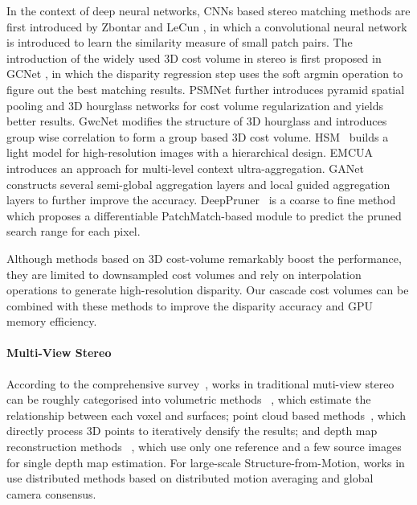 \documentclass[10pt,twocolumn,letterpaper]{article}
\begin{document}
In the context of deep neural networks, CNNs based stereo matching methods are first introduced by Zbontar and LeCun \cite{zbontar2015computing}, in which a convolutional neural network is introduced to learn the similarity measure of small patch pairs. The introduction of the widely used 3D cost volume in stereo is first proposed in GCNet \cite{kendall2017end},
in which the disparity regression step uses the soft argmin operation to figure out the best matching results. 
PSMNet \cite{chang2018pyramid} further introduces pyramid spatial pooling and 3D hourglass networks for cost volume regularization and yields better results. GwcNet \cite{guo2019group} modifies the structure of 3D hourglass and introduces group wise correlation to form a group based 3D cost volume. 
HSM~\cite{yang2019hierarchical} builds a light model for high-resolution images with a hierarchical design.
EMCUA~\cite{nie2019multi} introduces an approach for multi-level context ultra-aggregation.
GANet~\cite{zhang2019ga} constructs several semi-global aggregation layers and local guided aggregation layers to further improve the accuracy. DeepPruner~\cite{duggal2019deeppruner} is a coarse to fine method which proposes a differentiable PatchMatch-based module to predict the pruned search range for each pixel.


Although methods based on 3D cost-volume remarkably boost the performance, they are limited to downsampled cost volumes and rely on interpolation operations to generate high-resolution disparity. Our cascade cost volumes can be combined with these methods to improve the disparity accuracy and GPU memory efficiency.




\paragraph{Multi-View Stereo}\vspace{-4mm}
According to the comprehensive survey~\cite{furukawa2015multi}, works in traditional muti-view stereo can be roughly categorised into volumetric methods ~\cite{kutulakos2000theory_mvsnet20,seitz1999photorealistic_mvsnet33,ji2017surfacenet_mvsnet14,kar2017learning_mvsnet15}, which estimate the relationship between each voxel and surfaces; point cloud based methods~\cite{lhuillier2005quasi_22,furukawa2009accurate_7}, which directly process 3D points to iteratively densify the results; and depth map reconstruction methods~ \cite{tola2012efficient_mvsnet35,campbell2008using_mvsnet3,galliani2015massively_mvsnet8,schonberger2016pixelwise_mvsnet32,yao2017relative_mvsnet38, romanoni2019tapa}, which use only one reference and a few source images for single depth map estimation. For large-scale Structure-from-Motion, works in~\cite{zhang2017distributed, zhu2018very} use distributed methods based on distributed motion averaging and global camera consensus.
\end{document}
